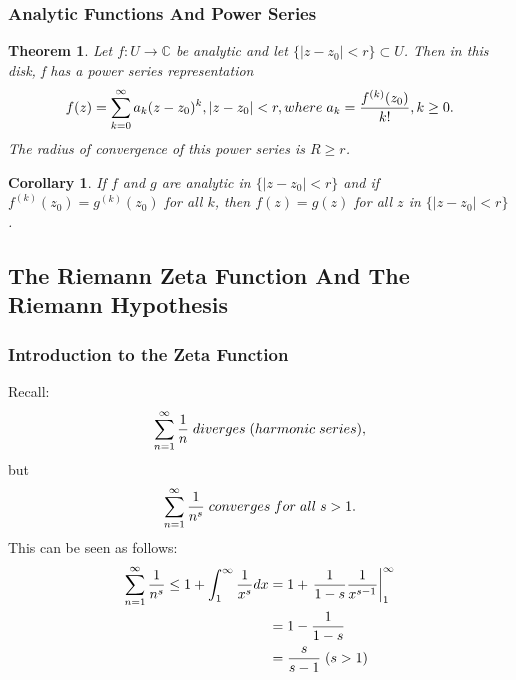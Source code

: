 \documentclass{article}
\newtheorem{theorem}{Theorem}[section]
\newtheorem{corollary}{Corollary}[theorem]
\begin{document}
\subsubsection{Analytic Functions And Power Series}
\begin{theorem}
Let $f : U \to \mathbb{C}$ be analytic and let $\{\left|z - z_0\right| < r \} \subset U$. Then in this disk, f has a power series representation
\begin{equation*} 
f(z) = \sum_{k=0}^{\infty} a_k (z - z_0)^k, \left|z - z_0\right| < r, where \hspace{0.1cm} a_k = \frac{f^{(k)}(z_0)}{k!}, k \geq 0.
\end{equation*}
The radius of convergence of this power series is $R \geq r$.
\end{theorem}
\begin{corollary}
If $f$ and $g$ are analytic in $\{\left|z - z_0\right| < r \}$ and if $f^{(k)}(z_0) = g^{(k)}(z_0)$ for all $k$, then $f(z) = g(z)$ for all $z$ in $\{\left|z - z_0\right| < r \}$.
\end{corollary}

\subsection{The Riemann Zeta Function And The Riemann Hypothesis}

\subsubsection{Introduction to the Zeta Function}
Recall:
\begin{equation*}
\sum_{n=1}^{\infty} \frac{1}{n} \hspace{0.1cm} diverges \hspace{0.1cm} (harmonic \hspace{0.1cm} series),
\end{equation*}
but
\begin{equation*}
\sum_{n=1}^{\infty} \frac{1}{n^s} \hspace{0.1cm} converges \hspace{0.1cm} for \hspace{0.1cm} all \hspace{0.1cm} s > 1.
\end{equation*}
This can be seen as follows:
\begin{align*}
\sum_{n=1}^{\infty} \frac{1}{n^s} \leq 1 + \int_1^{\infty} \frac{1}{x^s}dx &= 1 + \left. \frac{1}{1-s} \frac{1}{x^{s-1}} \right|_{1}^{\infty} \\
&= 1 - \frac{1}{1-s} \\
&= \frac{s}{s - 1} \hspace{0.1cm} (s > 1)
\end{align*}
\end{document}
